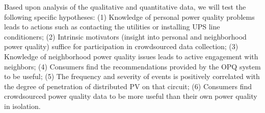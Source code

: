 Based upon analysis of the qualitative and quantitative data, we will test the following specific hypotheses: (1) Knowledge of personal power quality problems leads to actions such as contacting the utilities or installing UPS line conditioners; (2) Intrinsic motivators (insight into personal and neighborhood power quality) suffice for participation in crowdsourced data collection; (3) Knowledge of neighborhood power quality issues leads to active engagement with neighbors; (4) Consumers find the recommendations provided by the OPQ system to be useful; (5) The frequency and severity of events is positively correlated with the degree of penetration of distributed PV on that circuit; (6) Consumers find crowdsourced power quality data to be more useful than their own power quality in isolation.





















